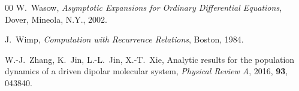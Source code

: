 \documentclass[11pt]{article}
\begin{document}
\begin{thebibliography}{00}
 W.\ Wasow, \emph{Asymptotic Expansions for Ordinary Differential Equations}, Dover,
Mineola, N.Y., 2002.

 J.\ Wimp, \emph{Computation with Recurrence Relations}, Boston, 1984.

 W.-J.\ Zhang, K.\ Jin, L.-L.\ Jin, X.-T.\ Xie, Analytic results for the population dynamics of
a driven dipolar molecular system, \textit{Physical Review A}, 2016, \textbf{93}, 043840.

\end{thebibliography}
\end{document}
